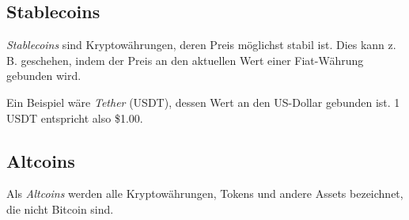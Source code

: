 \subsection{Stablecoins}
\textit{Stablecoins} sind Kryptowährungen, deren Preis möglichst stabil ist. Dies kann z. B. geschehen, indem der Preis an den aktuellen Wert einer Fiat-Währung gebunden wird.

Ein Beispiel wäre \textit{Tether} (USDT), dessen Wert an den US-Dollar gebunden ist. 1 USDT entspricht also \$1.00.

\subsection{Altcoins}
Als \textit{Altcoins} werden alle Kryptowährungen, Tokens und andere Assets bezeichnet, die nicht Bitcoin sind.